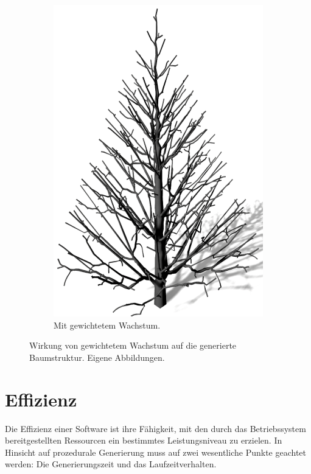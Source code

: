 \begin{figure} [hbtp]
\begin{subfigure}[t]{.45\textwidth}
		\includegraphics[height=.3\textheight]{images/SCA_GewWachstum_On.png}
		\caption{Mit gewichtetem Wachstum.}
		\label{subfig:SCA_GewWachstum_On}
	\end{subfigure}	
	\caption{Wirkung von gewichtetem Wachstum auf die generierte Baumstruktur. Eigene Abbildungen.}
	\label{fig:SCA_GewWachstum}
\end{figure}


\section{Effizienz}

Die Effizienz einer Software ist ihre Fähigkeit, mit den durch das Betriebssystem bereitgestellten Ressourcen ein bestimmtes Leistungsniveau zu erzielen. \cite[S.259]{Softwaremanagement:98} In Hinsicht auf prozedurale Generierung muss auf zwei wesentliche Punkte geachtet werden: Die Generierungszeit und das Laufzeitverhalten.

